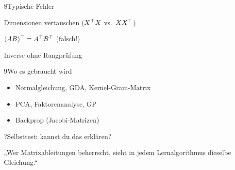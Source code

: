 \begin{hngrid}
%
\begin{hnp}[raster multicolumn=2,acc=hnred]{8}{Typische Fehler}
\begin{hncon}
\item Dimensionen vertauschen ($X^{\top} X$ vs.\ $XX^{\top}$)
\item $(AB)^{\top}=A^{\top} B^{\top}$ (falsch!)
\item Inverse ohne Rangprüfung
\end{hncon}
\end{hnp}
%
\begin{hnp}[raster multicolumn=2,acc=hnorange]{9}{Wo es gebraucht wird}
\begin{itemize}
\item Normalgleichung, GDA, Kernel-Gram-Matrix
\item PCA, Faktorenanalyse, GP
\item Backprop (Jacobi-Matrizen)
\end{itemize}
\end{hnp}
%
\begin{hnp}[raster multicolumn=6,acc=hnpurple,colback=hnlilac!30]{?}{Selbsttest: kannst du das erklären?}
\end{hnp}
%
\begin{hnbanner}[raster multicolumn=6]
„Wer Matrixableitungen beherrscht, sieht in jedem Lernalgorithmus dieselbe Gleichung.“
\end{hnbanner}
\end{hngrid}
